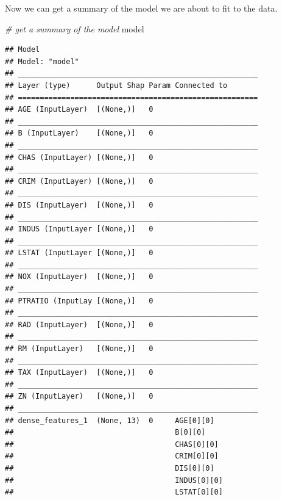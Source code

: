 \documentclass[
  12pt,
]{style/krantz}
\newenvironment{Shaded}{\begin{snugshade}}{\end{snugshade}}
\newcommand{\CommentTok}[1]{\textcolor[rgb]{0.56,0.35,0.01}{\textit{#1}}}
\newcommand{\NormalTok}[1]{#1}
\begin{document}
Now we can get a summary of the model we are about to fit to the data.

\begin{Shaded}
\begin{Highlighting}[]
\CommentTok{\# get a summary of the model}
\NormalTok{model}
\end{Highlighting}
\end{Shaded}

\begin{verbatim}
## Model
## Model: "model"
## _______________________________________________________
## Layer (type)      Output Shap Param Connected to       
## =======================================================
## AGE (InputLayer)  [(None,)]   0                        
## _______________________________________________________
## B (InputLayer)    [(None,)]   0                        
## _______________________________________________________
## CHAS (InputLayer) [(None,)]   0                        
## _______________________________________________________
## CRIM (InputLayer) [(None,)]   0                        
## _______________________________________________________
## DIS (InputLayer)  [(None,)]   0                        
## _______________________________________________________
## INDUS (InputLayer [(None,)]   0                        
## _______________________________________________________
## LSTAT (InputLayer [(None,)]   0                        
## _______________________________________________________
## NOX (InputLayer)  [(None,)]   0                        
## _______________________________________________________
## PTRATIO (InputLay [(None,)]   0                        
## _______________________________________________________
## RAD (InputLayer)  [(None,)]   0                        
## _______________________________________________________
## RM (InputLayer)   [(None,)]   0                        
## _______________________________________________________
## TAX (InputLayer)  [(None,)]   0                        
## _______________________________________________________
## ZN (InputLayer)   [(None,)]   0                        
## _______________________________________________________
## dense_features_1  (None, 13)  0     AGE[0][0]          
##                                     B[0][0]            
##                                     CHAS[0][0]         
##                                     CRIM[0][0]         
##                                     DIS[0][0]          
##                                     INDUS[0][0]        
##                                     LSTAT[0][0]        

\end{verbatim}
\end{document}
